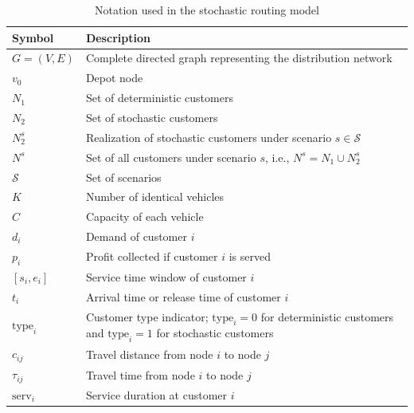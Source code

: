 \documentclass[pdflatex]{sn-jnl}
\begin{document}
\begin{table}
\centering
\caption{Notation used in the stochastic routing model}
\label{tab:notation_svrptw}
\begin{tabular}{lp{10.8cm}}
\toprule
Symbol & Description \\
\midrule
$G=(V,E)$ & Complete directed graph representing the distribution network \\

$v_0$ & Depot node \\

$N_1$ & Set of deterministic customers \\

$N_2$ & Set of stochastic customers \\

$N_2^s$ & Realization of stochastic customers under scenario $s\in\mathcal{S}$ \\

$N^s$ & Set of all customers under scenario $s$, i.e., $N^s=N_1\cup N_2^s$ \\

$\mathcal{S}$ & Set of scenarios \\

$K$ & Number of identical vehicles \\

$C$ & Capacity of each vehicle \\

$d_i$ & Demand of customer $i$ \\

$p_i$ & Profit collected if customer $i$ is served \\

$[s_i,e_i]$ & Service time window of customer $i$ \\

$t_i$ & Arrival time or release time of customer $i$ \\

$\mathrm{type}_i$ & Customer type indicator; $\mathrm{type}_i=0$ for deterministic customers and $\mathrm{type}_i=1$ for stochastic customers \\

$c_{ij}$ & Travel distance from node $i$ to node $j$ \\

$\tau_{ij}$ & Travel time from node $i$ to node $j$ \\

$\mathrm{serv}_i$ & Service duration at customer $i$ \\


\end{tabular}
\end{table}
\end{document}

